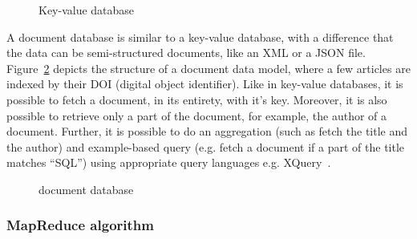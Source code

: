 \begin{figure}[htbp!]
	\centerline{
	}
	\caption{Key-value database}
	\label{fig:bigdata:key-value}
\end{figure}


 
A document database is similar to a key-value database, with a difference that the data can be semi-structured documents, like an XML 
or a JSON file. Figure~\ref{fig:bigdata:document} depicts the structure of a document data model, where a few articles are indexed by 
their DOI (digital object identifier). Like in key-value databases, it is possible to fetch a document, in its entirety, with it's key. 
Moreover, it is also possible to retrieve only a part of the document, for example, the author of a document. Further, it is possible 
to do an aggregation (such as fetch the title and the author) and example-based query (e.g. fetch a document if a part of the title 
matches ``SQL'') using appropriate query languages e.g. XQuery~\citep{XQuery:2017}. 

\begin{figure}[htbp!]
	\centerline{
	}
	\caption{document database}
	\label{fig:bigdata:document}
\end{figure}

\subsubsection*{MapReduce algorithm}

